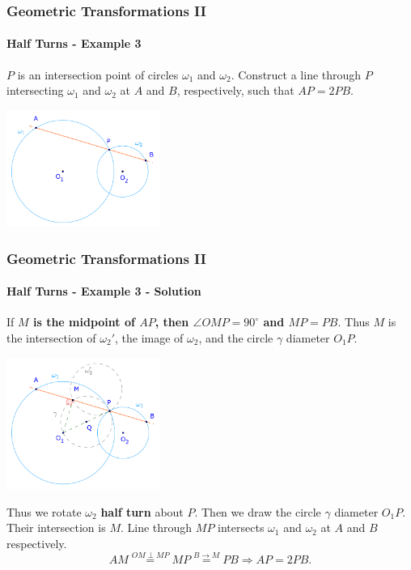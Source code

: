 \documentclass[8pt,xcolor=table,dvipsnames]{beamer}
\newcommand{\dg}{^\circ}
\begin{document}
\begin{frame}[t]
    \frametitle{Geometric Transformations II}
    \framesubtitle{Half Turns - Example 3}
    \begin{example}
        $P$ is an intersection point of circles $\omega_1$ and $\omega_2$.
        Construct a line through $P$ intersecting $\omega_1$ and $\omega_2$ at $A$ and $B$, respectively,
        such that $AP = 2PB.$
    \end{example}

    \begin{center}
        \includegraphics[width=5cm]{./svg/pdf/rotation-2a.pdf}
    \end{center}
\end{frame}

\begin{frame}[t]
    \frametitle{Geometric Transformations II}
    \framesubtitle{Half Turns - Example 3 - Solution}
    If \textbf{$M$ is the midpoint of $AP$, then $\angle OMP = 90\dg$ and $MP = PB$}.
    Thus $M$ is the intersection of $\omega_2'$, the image of $\omega_2$, and the circle $\gamma$ diameter $O_1P.$
    \begin{center}
        \includegraphics[width=5cm]{./svg/pdf/rotation-2b.pdf}
    \end{center}
    Thus we rotate $\omega_2$ \textbf{half turn} about $P$.
    Then we draw the circle $\gamma$ diameter $O_1P.$
    Their intersection is $M$. Line through $MP$ intersects $\omega_1$ and $\omega_2$ at $A$ and $B$ respectively.
    \[
        AM \stackrel{OM \perp MP}{=} MP \stackrel{B \rightarrow M}{=} PB \Rightarrow AP = 2PB.
    \]
\end{frame}
\end{document}
